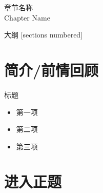 \documentclass{styles/cuzbeamer}
\begin{document}
    
    \maketitle

    \begin{standout}[第X章]
        章节名称\\
        Chapter Name
    \end{standout}

    \begin{frame}{大纲}
        [sections numbered]
        \tableofcontents
    \end{frame}

    \section{简介/前情回顾}

    \begin{frame}
        \begin{block}{标题}
            \begin{itemize}
                \item 第一项
                \item 第二项
                \item 第三项
            \end{itemize}
        \end{block}
    \end{frame}

    \section{进入正题}

    \begin{frame}
    \end{frame}
\end{document}
